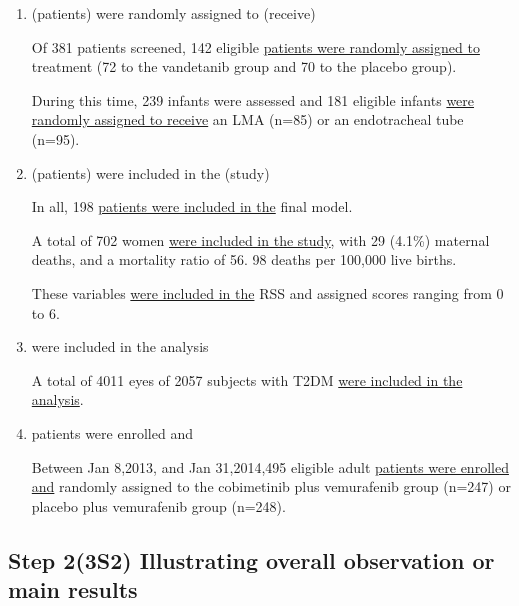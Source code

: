 \documentclass{ctexbook}
\begin{document}
    \begin{enumerate}
      \item (patients) were randomly assigned to (receive)
      \begin{eg}{}
        Of 381 patients screened, 142 eligible \uline{patients were randomly assigned to} treatment (72 to the vandetanib group and 70 to the placebo group).
      \end{eg}

      \begin{eg}{}
        During this time, 239 infants were assessed and 181 eligible infants \uline{were randomly assigned to receive} an LMA (n=85) or an endotracheal tube (n=95).    
      \end{eg}

      \item (patients) were included in the (study)
      \begin{eg}{}
        In all, 198 \uline{patients were included in the} final model.
      \end{eg}

      \begin{eg}{}
        A total of 702 women \uline{were included in the study}, with 29 (4.1\%) maternal deaths, and a mortality ratio of 56. 98 deaths per 100,000 live births.  
      \end{eg}

      \begin{eg}{}
        These variables \uline{were included in the} RSS and assigned scores ranging from 0 to 6. 
      \end{eg}

      \item were included in the analysis
      \begin{eg}{}
        A total of 4011 eyes of 2057 subjects with T2DM \uline{were included in the analysis}.
      \end{eg}

      \item patients were enrolled and
      \begin{eg}{}
        Between Jan 8,2013, and Jan 31,2014,495 eligible adult \uline{patients were enrolled and} randomly assigned to the cobimetinib plus vemurafenib group (n=247) or placebo plus vemurafenib group (n=248).   
      \end{eg}
    \end{enumerate}

  \subsection{Step 2(3S2) Illustrating overall observation or main results}
\end{document}
